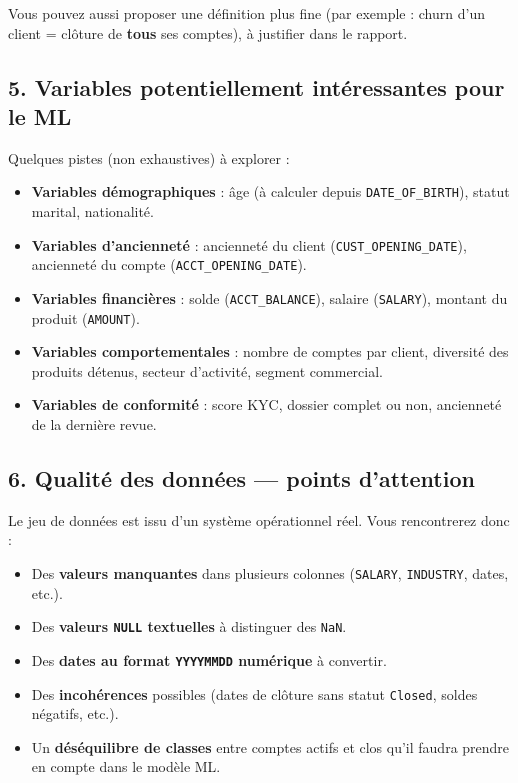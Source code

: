 \documentclass[11pt,a4paper]{article}
\providecommand{\tightlist}{\setlength{\itemsep}{0pt}\setlength{\parskip}{0pt}}
\begin{document}
Vous pouvez aussi proposer une définition plus fine (par exemple : churn
d'un client = clôture de \textbf{tous} ses comptes), à justifier dans le
rapport.

\subsection{5. Variables potentiellement intéressantes pour le
ML}\label{variables-potentiellement-intuxe9ressantes-pour-le-ml}

Quelques pistes (non exhaustives) à explorer :

\begin{itemize}
\tightlist
\item
  \textbf{Variables démographiques} : âge (à calculer depuis
  \texttt{DATE\_OF\_BIRTH}), statut marital, nationalité.
\item
  \textbf{Variables d'ancienneté} : ancienneté du client
  (\texttt{CUST\_OPENING\_DATE}), ancienneté du compte
  (\texttt{ACCT\_OPENING\_DATE}).
\item
  \textbf{Variables financières} : solde (\texttt{ACCT\_BALANCE}),
  salaire (\texttt{SALARY}), montant du produit (\texttt{AMOUNT}).
\item
  \textbf{Variables comportementales} : nombre de comptes par client,
  diversité des produits détenus, secteur d'activité, segment
  commercial.
\item
  \textbf{Variables de conformité} : score KYC, dossier complet ou non,
  ancienneté de la dernière revue.
\end{itemize}

\subsection{6. Qualité des données --- points
d'attention}\label{qualituxe9-des-donnuxe9es-points-dattention}

Le jeu de données est issu d'un système opérationnel réel. Vous
rencontrerez donc :

\begin{itemize}
\tightlist
\item
  Des \textbf{valeurs manquantes} dans plusieurs colonnes
  (\texttt{SALARY}, \texttt{INDUSTRY}, dates, etc.).
\item
  Des \textbf{valeurs \texttt{NULL} textuelles} à distinguer des
  \texttt{NaN}.
\item
  Des \textbf{dates au format \texttt{YYYYMMDD} numérique} à convertir.
\item
  Des \textbf{incohérences} possibles (dates de clôture sans statut
  \texttt{Closed}, soldes négatifs, etc.).
\item
  Un \textbf{déséquilibre de classes} entre comptes actifs et clos qu'il
  faudra prendre en compte dans le modèle ML.
\end{itemize}
\end{document}
